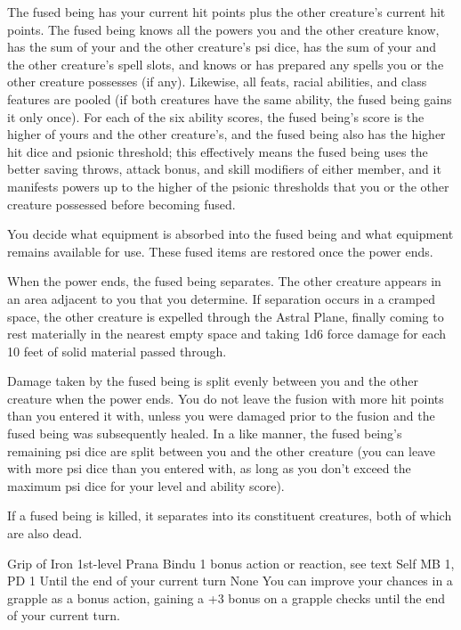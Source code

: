 The fused being has your current hit points plus the other
creature's current hit points. The fused being knows all
the powers you and the other creature know, has the sum of
your and the other creature's psi dice, has the sum of your
and the other creature's spell slots, and knows or has prepared
any spells you or the other creature possesses (if any). Likewise,
all feats, racial abilities, and class features are pooled
(if both creatures have the same ability, the fused being
gains it only once). For each of the six ability scores, the
fused being's score is the higher of yours and the other
creature's, and the fused being also has the higher hit dice
and psionic threshold; this effectively means the fused being
uses the better saving throws, attack bonus, and skill modifiers
of either member, and it manifests powers up to the higher
of the psionic thresholds that you or the other creature possessed
before becoming fused.

You decide what equipment is absorbed into the fused being
and what equipment remains available for use. These fused
items are restored once the power ends.

When the power ends, the fused being separates. The other
creature appears in an area adjacent to you that you determine.
If separation occurs in a cramped space, the other creature
is expelled through the Astral Plane, finally coming to rest
materially in the nearest empty space and taking 1d6 force
damage for each 10 feet of solid material passed through.

Damage taken by the fused being is split evenly between you
and the other creature when the power ends. You do not leave
the fusion with more hit points than you entered it with,
unless you were damaged prior to the fusion and the fused
being was subsequently healed. In a like manner, the fused
being's remaining psi dice are split between you and
the other creature (you can leave with more psi dice than you
entered with, as long as you don't exceed the maximum psi dice
for your level and ability score).

If a fused being is killed, it separates into its constituent
creatures, both of which are also dead.

\DndPowerHeader%
    {Grip of Iron\label{pwr:grip_of_iron}}
    {1st-level Prana Bindu}
    {1 bonus action or reaction, see text}
    {Self}
    {MB 1, PD 1}
    {Until the end of your current turn}
    {None}
You can improve your chances in a grapple
as a bonus action, gaining a +3 bonus on a grapple checks
until the end of your current turn.


